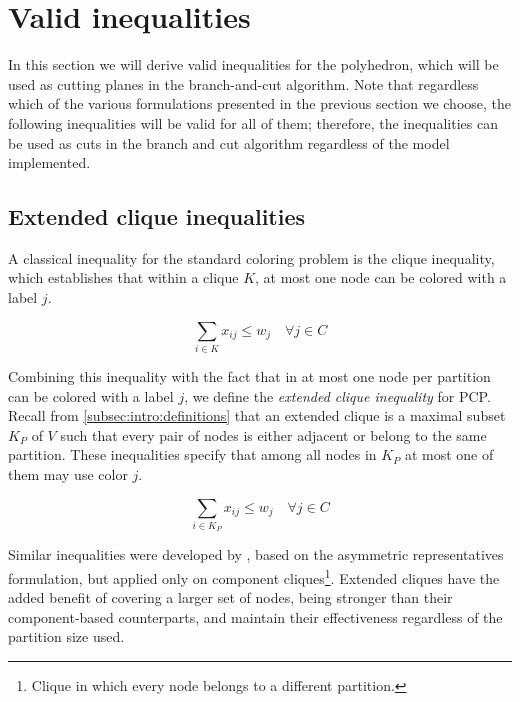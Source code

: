 
\section{Valid inequalities}
\label{sec:ineqs}

In this section we will derive valid inequalities for the \PCP{} polyhedron, which will be used as cutting planes in the branch-and-cut algorithm. Note that regardless which of the various formulations presented in the previous section we choose, the following inequalities will be valid for all of them; therefore, the inequalities can be used as cuts in the branch and cut algorithm regardless of the model implemented.

\subsection{Extended clique inequalities}

A classical inequality for the standard coloring problem is the clique inequality, which establishes that within a clique $K$, at most one node can be colored with a label $j$.

\begin{equation}
\nonumber
\sum_{i \in K} x_{ij} \leq w_{j} \quad \forall j \in C
\end{equation}

Combining this inequality with the fact that in \PCP{} at most one node per partition can be colored with a label $j$, we define the \textit{extended clique inequality} for PCP. Recall from \ref{subsec:intro:definitions} that an extended clique is a maximal subset $K_P$ of $V$ such that every pair of nodes is either adjacent or belong to the same partition. These inequalities specify that among all nodes in $K_P$ at most one of them may use color $j$.

\begin{equation}
\label{ineq:extendedclique}
\sum_{i \in K_P} x_{ij} \leq w_{j} \quad \forall j \in C
\end{equation}

Similar inequalities were developed by \cite{frota2010branch}, based on the asymmetric representatives formulation, but applied only on component cliques\footnote{Clique in which every node belongs to a different partition.}. Extended cliques have the added benefit of covering a larger set of nodes, being stronger than their component-based counterparts, and maintain their effectiveness regardless of the partition size used.

